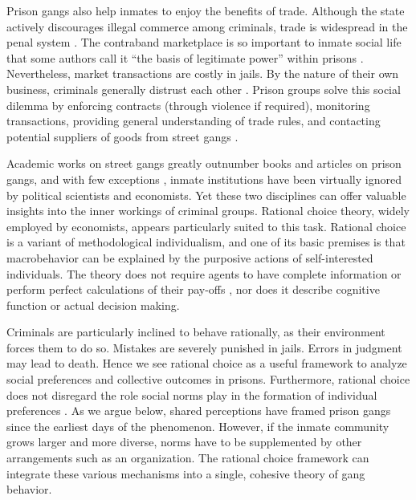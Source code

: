 \documentclass[a4paper, 12pt]{article}
\begin{document}
Prison gangs also help inmates to enjoy the benefits of trade. Although the state actively discourages illegal commerce among criminals, trade is widespread in the penal system \citep{davidson1974chicano,kalinich1986power,lankenau2001smoke,williams1974convicts}. The contraband marketplace is so important to inmate social life that some authors call it ``the basis of legitimate power'' within prisons \citep{kalinich1985contraband}. Nevertheless, market transactions are costly in jails. By the nature of their own business, criminals generally distrust each other \citep{gambetta2009codes}. Prison groups solve this social dilemma by enforcing contracts (through violence if required), monitoring transactions, providing general understanding of trade rules, and contacting potential suppliers of goods from street gangs \citep{blatchford2008black}.

Academic works on street gangs greatly outnumber books and articles on prison gangs, and with few exceptions \citep[e.g.][]{freire2014entering,skarbek2010self,skarbek2011governance,skarbek2012prison,skarbek2014social}, inmate institutions have been virtually ignored by political scientists and economists. Yet these two disciplines can offer valuable insights into the inner workings of criminal groups. Rational choice theory, widely employed by economists, appears particularly suited to this task. Rational choice is a variant of methodological individualism, and one of its basic premises is that macrobehavior can be explained by the purposive actions of self-interested individuals. The theory does not require agents to have complete information or perform perfect calculations of their pay-offs \citep{simon1955behavioral}, nor does it describe cognitive function or actual decision making.

Criminals are particularly inclined to behave rationally, as their environment forces them to do so. Mistakes are severely punished in  jails. Errors in judgment may lead to death. Hence we see rational choice as a useful framework to analyze social preferences and collective outcomes in prisons. Furthermore, rational choice does not disregard the role social norms play in the formation of individual preferences \citep{crawford1995grammar,elster1989social,ostrom2000collective}. As we argue below, shared perceptions have framed prison gangs since the earliest days of the phenomenon. However, if the inmate community grows larger and more diverse, norms have to be supplemented by other arrangements such as an organization. The rational choice framework can integrate these various mechanisms into a single, cohesive theory of gang behavior. 
\end{document}

